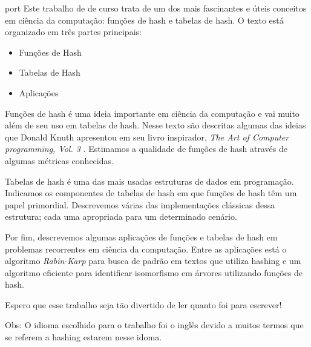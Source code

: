 \begin{resumo}{port}
  Este trabalho de  de curso trata de um dos mais fascinantes e úteis conceitos em ciência da computação: funções de hash e tabelas de hash. O texto está organizado em três partes principais:

\begin{itemize}
  \item Funções de Hash
  \item Tabelas de Hash
  \item Aplicações
\end{itemize}

Funções de hash é uma ideia importante em ciência da computação e vai muito além de seu uso em tabelas de hash. Nesse texto são descritas algumas das ideias que Donald Knuth apresentou em seu livro inspirador, \textit{The Art of Computer programming, Vol. 3} \citep{TAOCP3}. Estimamos a qualidade de funções de hash através de algumas métricas conhecidas.

Tabelas de hash é uma das mais usadas estruturas de dados em programação. Indicamos os componentes de tabelas de hash em que funções de hash têm um papel primordial. Descrevemos várias das implementações clássicas dessa estrutura; cada uma apropriada para um determinado cenário.

Por fim, descrevemos algumas aplicações de funções e tabelas de hash em problemas recorrentes em ciência da computação. Entre as aplicações está o algoritmo \textit{Rabin-Karp} para busca de padrão em textos que utiliza hashing e um algoritmo eficiente para identificar isomorfismo em árvores utilizando funções de hash.

Espero que esse trabalho seja tão divertido de ler quanto foi para escrever!

Obs: O idioma escolhido para o trabalho foi o inglês devido a muitos termos que se referem a hashing estarem nesse idoma. 

\end{resumo}

